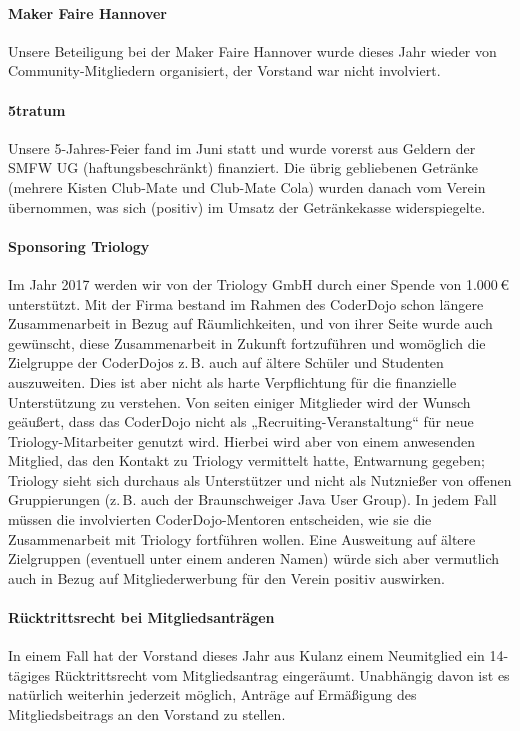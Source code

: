 \documentclass{s0minutes}
\begin{document}
\paragraph{Maker Faire Hannover} Unsere Beteiligung bei der Maker Faire Hannover
wurde dieses Jahr wieder von Community-Mitgliedern organisiert, der Vorstand war
nicht involviert.

\paragraph{5tratum}
Unsere 5-Jahres-Feier fand im Juni statt und wurde vorerst aus Geldern
der SMFW UG (haftungsbeschränkt) finanziert. Die übrig gebliebenen Getränke
(mehrere Kisten Club-Mate und Club-Mate Cola) wurden danach vom Verein
übernommen, was sich (positiv) im Umsatz der Getränkekasse widerspiegelte.

\paragraph{Sponsoring Triology}
Im Jahr 2017 werden wir von der Triology GmbH durch einer Spende von 1{.}000\,€
unterstützt. Mit der Firma bestand im Rahmen des CoderDojo schon längere
Zusammenarbeit in Bezug auf Räumlichkeiten, und von ihrer Seite wurde auch
gewünscht, diese Zusammenarbeit in Zukunft fortzuführen und womöglich die
Zielgruppe der CoderDojos z.\,B. auch auf ältere Schüler und Studenten
auszuweiten. Dies ist aber nicht als harte Verpflichtung für die finanzielle
Unterstützung zu verstehen. Von seiten einiger Mitglieder wird der Wunsch
geäußert, dass das CoderDojo nicht als „Recruiting-Veranstaltung“ für neue
Triology-Mitarbeiter genutzt wird. Hierbei wird aber von einem anwesenden
Mitglied, das den Kontakt zu Triology vermittelt hatte, Entwarnung gegeben;
Triology sieht sich durchaus als Unterstützer und nicht als Nutznießer von
offenen Gruppierungen (z.\,B. auch der Braunschweiger Java User Group). In jedem
Fall müssen die involvierten CoderDojo-Mentoren entscheiden, wie sie die
Zusammenarbeit mit Triology fortführen wollen. Eine Ausweitung auf ältere
Zielgruppen (eventuell unter einem anderen Namen) würde sich aber vermutlich
auch in Bezug auf Mitgliederwerbung für den Verein positiv auswirken.

\paragraph{Rücktrittsrecht bei Mitgliedsanträgen}
In einem Fall hat der Vorstand dieses Jahr aus Kulanz einem Neumitglied ein
14-tägiges Rücktrittsrecht vom Mitgliedsantrag eingeräumt. Unabhängig davon ist
es natürlich weiterhin jederzeit möglich, Anträge auf Ermäßigung des
Mitgliedsbeitrags an den Vorstand zu stellen.
\end{document}
